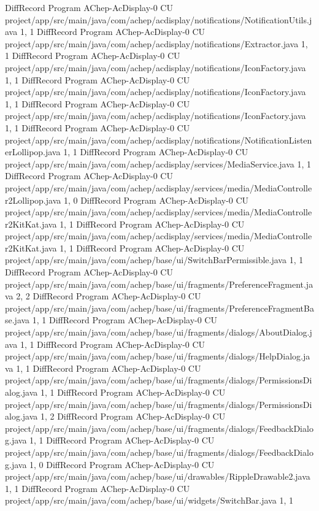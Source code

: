 DiffRecord Program AChep-AcDisplay-0 CU project/app/src/main/java/com/achep/acdisplay/notifications/NotificationUtils.java  {1, 1}
DiffRecord Program AChep-AcDisplay-0 CU project/app/src/main/java/com/achep/acdisplay/notifications/Extractor.java  {1, 1}
DiffRecord Program AChep-AcDisplay-0 CU project/app/src/main/java/com/achep/acdisplay/notifications/IconFactory.java  {1, 1}
DiffRecord Program AChep-AcDisplay-0 CU project/app/src/main/java/com/achep/acdisplay/notifications/IconFactory.java  {1, 1}
DiffRecord Program AChep-AcDisplay-0 CU project/app/src/main/java/com/achep/acdisplay/notifications/IconFactory.java  {1, 1}
DiffRecord Program AChep-AcDisplay-0 CU project/app/src/main/java/com/achep/acdisplay/notifications/NotificationListenerLollipop.java  {1, 1}
DiffRecord Program AChep-AcDisplay-0 CU project/app/src/main/java/com/achep/acdisplay/services/MediaService.java  {1, 1}
DiffRecord Program AChep-AcDisplay-0 CU project/app/src/main/java/com/achep/acdisplay/services/media/MediaController2Lollipop.java  {1, 0}
DiffRecord Program AChep-AcDisplay-0 CU project/app/src/main/java/com/achep/acdisplay/services/media/MediaController2KitKat.java  {1, 1}
DiffRecord Program AChep-AcDisplay-0 CU project/app/src/main/java/com/achep/acdisplay/services/media/MediaController2KitKat.java  {1, 1}
DiffRecord Program AChep-AcDisplay-0 CU project/app/src/main/java/com/achep/base/ui/SwitchBarPermissible.java  {1, 1}
DiffRecord Program AChep-AcDisplay-0 CU project/app/src/main/java/com/achep/base/ui/fragments/PreferenceFragment.java  {2, 2}
DiffRecord Program AChep-AcDisplay-0 CU project/app/src/main/java/com/achep/base/ui/fragments/PreferenceFragmentBase.java  {1, 1}
DiffRecord Program AChep-AcDisplay-0 CU project/app/src/main/java/com/achep/base/ui/fragments/dialogs/AboutDialog.java  {1, 1}
DiffRecord Program AChep-AcDisplay-0 CU project/app/src/main/java/com/achep/base/ui/fragments/dialogs/HelpDialog.java  {1, 1}
DiffRecord Program AChep-AcDisplay-0 CU project/app/src/main/java/com/achep/base/ui/fragments/dialogs/PermissionsDialog.java  {1, 1}
DiffRecord Program AChep-AcDisplay-0 CU project/app/src/main/java/com/achep/base/ui/fragments/dialogs/PermissionsDialog.java  {1, 2}
DiffRecord Program AChep-AcDisplay-0 CU project/app/src/main/java/com/achep/base/ui/fragments/dialogs/FeedbackDialog.java  {1, 1}
DiffRecord Program AChep-AcDisplay-0 CU project/app/src/main/java/com/achep/base/ui/fragments/dialogs/FeedbackDialog.java  {1, 0}
DiffRecord Program AChep-AcDisplay-0 CU project/app/src/main/java/com/achep/base/ui/drawables/RippleDrawable2.java  {1, 1}
DiffRecord Program AChep-AcDisplay-0 CU project/app/src/main/java/com/achep/base/ui/widgets/SwitchBar.java  {1, 1}
